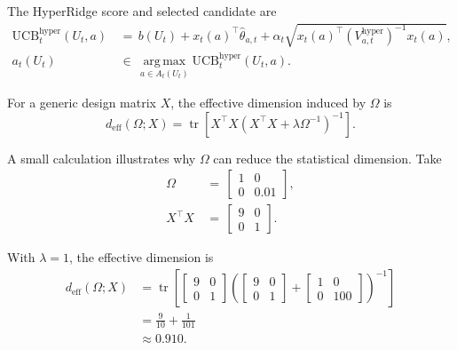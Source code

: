 \documentclass{article} %
\begin{document}
The HyperRidge score and selected candidate are
\begin{align}
\mathrm{UCB}_{t}^{\mathrm{hyper}}(U_t,a)
&\,=\,
b(U_t)+x_t(a)^\top \widehat{\theta}_{a,t}
+
\alpha_t
\sqrt{
x_t(a)^\top
\left(V_{a,t}^{\mathrm{hyper}}\right)^{-1}
x_t(a)
},
\label{eq:hyper-ucb-app}
\\
a_t(U_t)
&\,\in\,
\operatorname*{arg\,max}_{a\in A_t(U_t)}
\mathrm{UCB}_{t}^{\mathrm{hyper}}(U_t,a).
\label{eq:hyper-action}
\end{align}

For a generic design matrix \(X\), the effective dimension induced by \(\Omega\) is
\begin{equation}
\label{eq:hyper-deff-app}
d_{\mathrm{eff}}(\Omega;X)
=
\operatorname{tr}
\!\left[
X^\top X
\left(
X^\top X+\lambda\Omega^{-1}
\right)^{-1}
\right].
\end{equation}

A small calculation illustrates why \(\Omega\) can reduce the statistical
dimension. Take
\begin{align}
\Omega
&\,=\,
\begin{bmatrix}
1&0\\
0&0.01
\end{bmatrix},
\label{eq:hyper-example-omega}
\\
X^\top X
&\,=\,
\begin{bmatrix}
9&0\\
0&1
\end{bmatrix}.
\label{eq:hyper-example-xtx}
\end{align}

With \(\lambda=1\), the effective dimension is
\begin{equation}
\label{eq:hyper-example-deff-app}
\begin{aligned}
d_{\mathrm{eff}}(\Omega;X)
&=
\operatorname{tr}
\left[
\begin{bmatrix}
9&0\\
0&1
\end{bmatrix}
\left(
\begin{bmatrix}
9&0\\
0&1
\end{bmatrix}
+
\begin{bmatrix}
1&0\\
0&100
\end{bmatrix}
\right)^{-1}
\right]
\\
&=
\frac{9}{10}+\frac{1}{101}
\\
&\approx
0.910 .
\end{aligned}
\end{equation}
\end{document}

